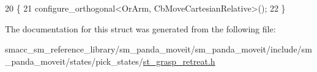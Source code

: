 \begin{DoxyCode}
20     \{
21         configure\_orthogonal<OrArm, CbMoveCartesianRelative>();
22     \}
\end{DoxyCode}


The documentation for this struct was generated from the following file\+:\begin{DoxyCompactItemize}
\item 
smacc\+\_\+sm\+\_\+reference\+\_\+library/sm\+\_\+panda\+\_\+moveit/sm\+\_\+panda\+\_\+moveit/include/sm\+\_\+panda\+\_\+moveit/states/pick\+\_\+states/\hyperlink{sm__panda__moveit_2sm__panda__moveit_2include_2sm__panda__moveit_2states_2pick__states_2st__grasp__retreat_8h}{st\+\_\+grasp\+\_\+retreat.\+h}\end{DoxyCompactItemize}
